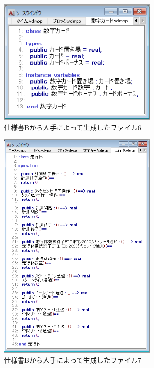 \begin{figure}[tp]
    \begin{center}
    \includegraphics[width=300]{image/speB_vdm6.PNG}
    \caption{仕様書Bから人手によって生成したファイル6}
    \label{fig:speB_vdm6}
    \end{center}
\end{figure}

\begin{figure}[tp]
    \begin{center}
    \includegraphics[width=300]{image/speB_vdm7.PNG}
    \caption{仕様書Bから人手によって生成したファイル7}
    \label{fig:speB_vdm7}
    \end{center}
\end{figure}


